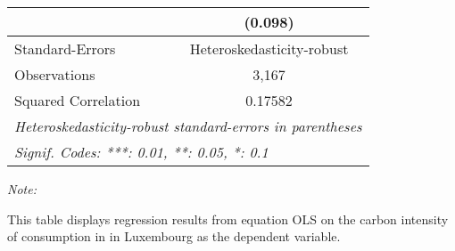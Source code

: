 \begin{table}[htbp!]
\begin{adjustbox}{width = 1\textwidth, max height = 0.95\textheight, center}
\begin{threeparttable}[b]
\begin{tabular}{lc}
                                & (0.098)\\   
            \midrule 
            Standard-Errors     & Heteroskedasticity-robust \\   
            Observations        & 3,167\\  
            Squared Correlation & 0.17582\\  
            \midrule \midrule
            \multicolumn{2}{l}{\emph{Heteroskedasticity-robust standard-errors in parentheses}}\\
            \multicolumn{2}{l}{\emph{Signif. Codes: ***: 0.01, **: 0.05, *: 0.1}}\\
         \end{tabular}
         
         \begin{tablenotes}\item \medskip \textit{Note:}
            \item This table displays regression results from equation OLS on the carbon intensity of consumption in  in Luxembourg as the dependent variable. 
         \end{tablenotes}
      \end{threeparttable}
   \end{adjustbox}
\end{table}


